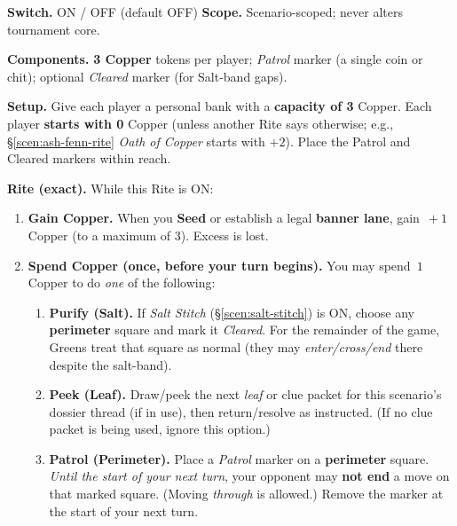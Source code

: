 \documentclass[11pt]{article}
\numberwithin{equation}{section} %
\theoremstyle{plain} %
\theoremstyle{definition} %
\theoremstyle{remark} %
\begin{document}
\medskip
\noindent\textbf{Switch.} \textsc{ON / OFF} (default \textsc{OFF}) \hfill \textbf{Scope.} Scenario-scoped; never alters tournament core.

\medskip
\noindent\textbf{Components.} \textbf{3 Copper} tokens per player; \emph{Patrol} marker (a single coin or chit); optional \emph{Cleared} marker (for Salt-band gaps).

\medskip
\noindent\textbf{Setup.} Give each player a personal bank with a \textbf{capacity of 3} Copper. Each player \textbf{starts with 0} Copper (unless another Rite says otherwise; e.g., \S\ref{scen:ash-fenn-rite} \emph{Oath of Copper} starts with \(+2\)). Place the Patrol and Cleared markers within reach.

\medskip
\noindent\textbf{Rite (exact).} While this Rite is \textsc{ON}:
\begin{enumerate}\setlength\itemsep{0.2em}
  \item \textbf{Gain Copper.} When you \textbf{Seed} or establish a legal \textbf{banner lane}, gain \(\,+1\) Copper (to a maximum of 3). Excess is lost.
  \item \textbf{Spend Copper (once, before your turn begins).} You may spend \(\,1\) Copper to do \emph{one} of the following:
  \begin{enumerate}\setlength\itemsep{0.2em}
    \item \textbf{Purify (Salt).} If \emph{Salt Stitch} (\S\ref{scen:salt-stitch}) is \textsc{ON}, choose any \textbf{perimeter} square and mark it \emph{Cleared}. For the remainder of the game, Greens treat that square as normal (they may \emph{enter/cross/end} there despite the salt-band). 
    \item \textbf{Peek (Leaf).} Draw/peek the next \emph{leaf} or clue packet for this scenario’s dossier thread (if in use), then return/resolve as instructed. (If no clue packet is being used, ignore this option.)
    \item \textbf{Patrol (Perimeter).} Place a \emph{Patrol} marker on a \textbf{perimeter} square. \textit{Until the start of your next turn}, your opponent may \textbf{not end} a move on that marked square. (Moving \emph{through} is allowed.) Remove the marker at the start of your next turn.
  \end{enumerate}
\end{enumerate}
\end{document}
